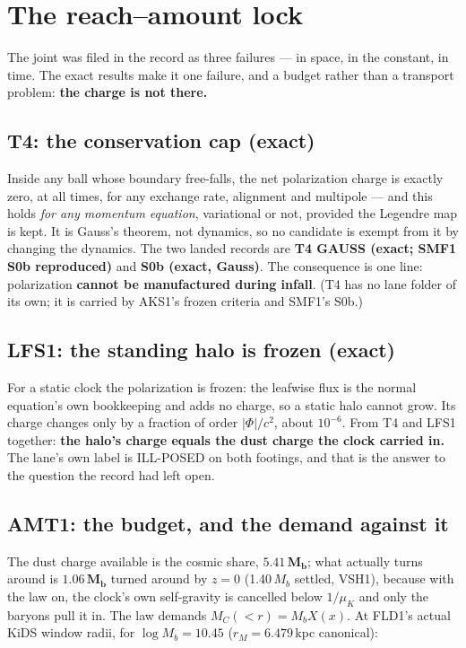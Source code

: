 \documentclass[10pt]{article}
\begin{document}
\section{The reach--amount lock}
\label{sec:lock}

The joint was filed in the record as three failures --- in space, in the constant, in time. The exact results
make it one failure, and a budget rather than a transport problem: {\bf the charge is not there.}

\subsection{T4: the conservation cap (exact)}
Inside any ball whose boundary free-falls, the net polarization charge is exactly zero, at all times, for any
exchange rate, alignment and multipole --- and this holds {\it for any momentum equation}, variational or not,
provided the Legendre map is kept. It is Gauss's theorem, not dynamics, so no candidate is exempt from it by
changing the dynamics. The two landed records are \textbf{T4 GAUSS (exact; SMF1 S0b reproduced)} and
\textbf{S0b (exact, Gauss)}. The consequence is one line: polarization {\bf cannot be manufactured during
infall}. (T4 has no lane folder of its own; it is carried by AKS1's frozen criteria and SMF1's S0b.)

\subsection{LFS1: the standing halo is frozen (exact)}
For a static clock the polarization is frozen: the leafwise flux is the normal equation's own bookkeeping and
adds no charge, so a static halo cannot grow. Its charge changes only by a fraction of order
$|\Phi|/c^2$, about $10^{-6}$. From T4 and LFS1 together: {\bf the halo's charge equals the dust charge the
clock carried in.} The lane's own label is ILL-POSED on both footings, and that is the answer to the question
the record had left open.

\subsection{AMT1: the budget, and the demand against it}
The dust charge available is the cosmic share, $\mathbf{5.41\,M_b}$; what actually turns around is
$\mathbf{1.06\,M_b}$ turned around by $z=0$ (1.40\,$M_b$ settled, VSH1), because with the law on, the clock's
own self-gravity is cancelled below $1/\mu_K$ and only the baryons pull it in. The law demands
$M_C(<r)=M_bX(x)$. At FLD1's actual KiDS window radii, for $\log M_b=10.45$ ($r_M=6.479$\,kpc canonical):
\end{document}
